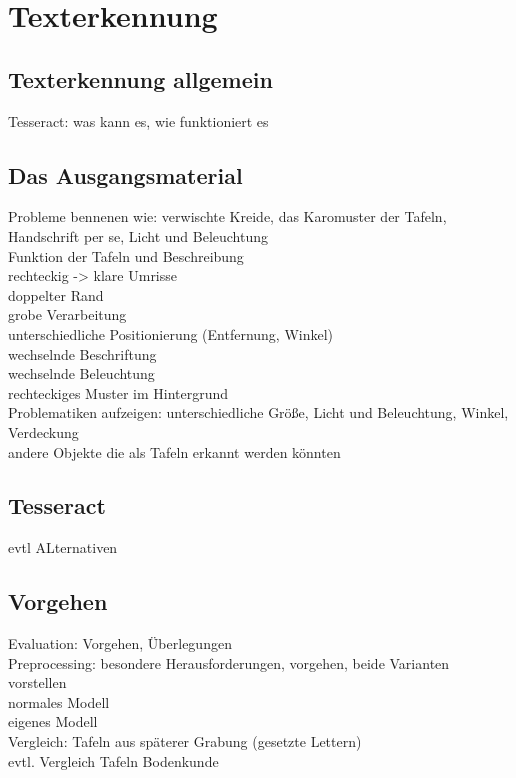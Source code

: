 \section{Texterkennung}
\subsection{Texterkennung allgemein}
Tesseract: was kann es, wie funktioniert es\\
\subsection{Das Ausgangsmaterial}
Probleme bennenen wie: verwischte Kreide, das Karomuster der Tafeln, Handschrift per se, Licht und Beleuchtung\\

Funktion der Tafeln und Beschreibung\\
rechteckig -> klare Umrisse\\
doppelter Rand\\
grobe Verarbeitung\\
unterschiedliche Positionierung (Entfernung, Winkel)\\
wechselnde Beschriftung\\
wechselnde Beleuchtung\\
rechteckiges Muster im Hintergrund\\

Problematiken aufzeigen: unterschiedliche Größe, Licht und Beleuchtung, Winkel, Verdeckung\\
andere Objekte die als Tafeln erkannt werden könnten\\
\subsection{Tesseract}

evtl ALternativen\\

\subsection{Vorgehen}
Evaluation: Vorgehen, Überlegungen\\
Preprocessing: besondere Herausforderungen, vorgehen, beide Varianten vorstellen\\
normales Modell\\
eigenes Modell\\
Vergleich: Tafeln aus späterer Grabung (gesetzte Lettern)\\
evtl. Vergleich Tafeln Bodenkunde\\